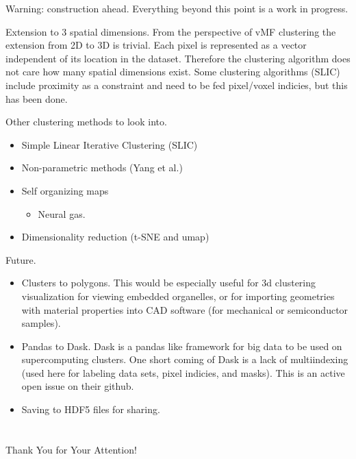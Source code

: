 \documentclass[
]{beamer}
\begin{document}
\begin{frame}{Warning: construction ahead.}
    Everything beyond this point is a work in progress.
\end{frame}

\begin{frame}{Extension to 3 spatial dimensions.}
From the perspective of vMF clustering the extension from 2D to 3D is trivial. Each pixel is represented as a vector independent of its location in the dataset. Therefore the clustering algorithm does not care how many spatial dimensions exist. Some clustering algorithms (SLIC) include proximity as a constraint and need to be fed pixel/voxel indicies, but this has been done.
\end{frame}

\begin{frame}{Other clustering methods to look into.}
\begin{itemize}
    \item Simple Linear Iterative Clustering (SLIC)
    \item Non-parametric methods (Yang et al.)
    \item Self organizing maps
    \begin{itemize}
        \item Neural gas.
    \end{itemize}
    \item Dimensionality reduction (t-SNE and umap)
\end{itemize}
\end{frame}

\begin{frame}{Future.}
\begin{itemize}
    \item Clusters to polygons. This would be especially useful for 3d clustering visualization for viewing embedded organelles, or for importing geometries with material properties into CAD software (for mechanical or semiconductor samples).
    \item Pandas to Dask. Dask is a pandas like framework for big data to be used on supercomputing clusters. One short coming of Dask is a lack of multiindexing (used here for labeling data sets, pixel indicies, and masks). This is an active open issue on their github.
    \item Saving to HDF5 files for sharing.
\end{itemize}
\end{frame}


\section{\bibname}
\begin{frame}[t, allowframebreaks]{\bibname}
\printbibliography[heading=none]
\end{frame}

\begin{frame}[plain]
\vfill
\centerline{Thank You for Your Attention!}
\vfill\vfill
\end{frame}
\end{document}
